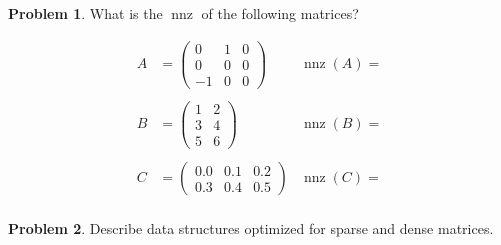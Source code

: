 \documentclass[10pt]{article}
\theoremstyle{definition}
\newtheorem{problem}{Problem}
\DeclareMathOperator{\nnz}{nnz}
\begin{document}
\begin{problem}
What is the $\nnz$ of the following matrices?

\begin{align*}
    A &= \begin{pmatrix} 0 & 1 & 0 \\ 0 & 0 & 0 \\ -1 & 0 & 0 \end{pmatrix} & \nnz(A) = \\
        \\
    B &= \begin{pmatrix} 1 & 2 \\ 3 & 4 \\ 5 & 6 \end{pmatrix} & \nnz(B) = \\
        \\
    C &= \begin{pmatrix} 0.0 & 0.1 & 0.2 \\ 0.3 & 0.4 & 0.5 \end{pmatrix} & \nnz(C) = \\
\end{align*}

\end{problem}
\vspace{4in}

\begin{problem}
    Describe data structures optimized for sparse and dense matrices.
\end{problem}
\end{document}
